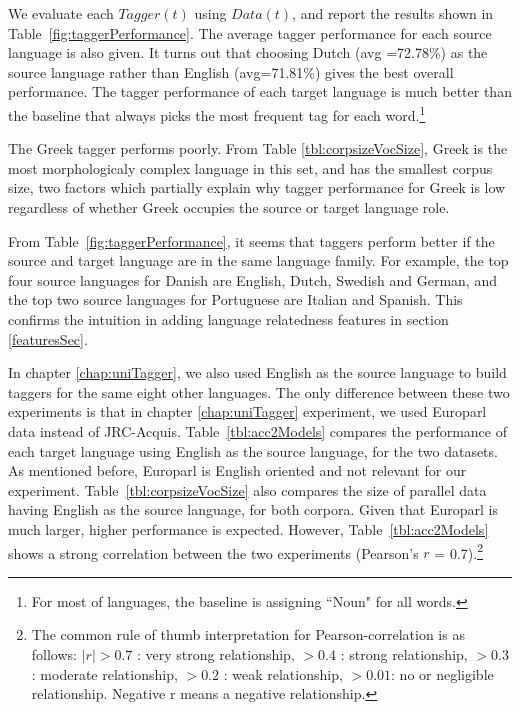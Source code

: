 We evaluate each $Tagger(t)$ using $Data(t)$, and report the results
shown in Table~\ref{fig:taggerPerformance}. The average tagger
performance for each source language is also given. It turns out that
choosing Dutch (avg =72.78\%) as the source language rather than
English (avg=71.81\%) gives the best overall performance. The tagger
performance of each target language is much better than the baseline
that always picks the most frequent tag for each word.\footnote{For most of languages, the baseline is assigning ``Noun" for all words.} 

The Greek tagger performs poorly. From Table \ref{tbl:corpsizeVocSize}, Greek is the most morphologicaly complex language in this set, and has the smallest corpus size, two factors which partially explain why tagger performance for Greek is low regardless of whether Greek occupies the source or target language role. 

From Table~\ref{fig:taggerPerformance}, it seems that taggers perform better if the source and target language are in the same language family. For example, the top four source languages for Danish are English, Dutch, Swedish and German, and the top two source languages for Portuguese are Italian and Spanish. This confirms the intuition in adding language relatedness features in section \ref{featuresSec}. 

In chapter \ref{chap:uniTagger}, we also used English as the source language to build taggers for the same eight other languages. The only difference between these two experiments is that in chapter \ref{chap:uniTagger} experiment, we used Europarl \cite{europarl} data instead of JRC-Acquis. Table~\ref{tbl:acc2Models} compares the performance of each target language using English as the source language, for the two datasets. As mentioned before, Europarl is English oriented and not relevant for our experiment. Table~\ref{tbl:corpsizeVocSize} also compares the size of parallel
data having English as the source language, for both corpora. Given
that Europarl is much larger, higher performance is expected. However,
Table~\ref{tbl:acc2Models} shows a strong correlation between the two
experiments (Pearson's $r$ = 0.7).\footnote{The common rule of thumb interpretation for Pearson-correlation is as follows: $|r| > 0.7$ : very strong relationship, $> 0.4$ : strong relationship, $> 0.3$ : moderate relationship, $> 0.2$ : weak relationship, $>0.01$: no or negligible relationship. Negative r means a negative relationship.}
 
